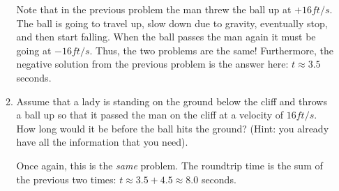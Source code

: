 \documentclass[letterpaper,12pt,fleqn]{article}
\begin{document}
\begin{enumerate}
\begin{enumerate}
\bigskip

Note that in the previous problem the man threw the ball up at $+16 ft/s$. The
ball is going to travel up, slow down due to gravity, eventually stop, and then
start falling. When the ball passes the man again it must be going at
$-16 ft/s$. Thus, the two problems are the same! Furthermore, the negative
solution from the previous problem is the answer here: $t\approx3.5$ seconds.

\item Assume that a lady is standing on the ground below the cliff and throws
a ball up so that it passed the man on the cliff at a velocity of $16 ft/s$.
How long would it be before the ball hits the ground? (Hint: you already have
all the information that you need).

Once again, this is the \emph{same} problem. The roundtrip time is the sum of
the previous two times: $t\approx3.5+4.5\approx8.0$ seconds.
\end{enumerate}

\end{enumerate}
\end{document}
